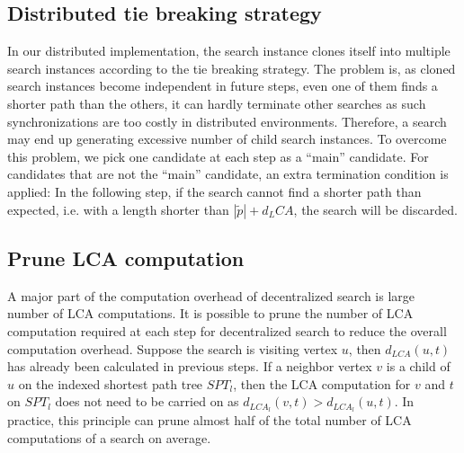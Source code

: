 \subsection{Distributed tie breaking strategy}
In our distributed implementation, the search instance clones itself into multiple search instances according to the tie breaking strategy. The problem is, as cloned search instances become independent in future steps, even one of them finds a shorter path than the others, it can hardly terminate other searches as such synchronizations are too costly in distributed environments. Therefore, a search may end up generating excessive number of child search instances. To overcome this problem, we pick one candidate at each step as a ``main'' candidate. For candidates that are not the ``main'' candidate, an extra termination condition is applied: In the following step, if the search cannot find a shorter path than expected, i.e. with a length shorter than $|\tilde{p}| + d_LCA$, the search will be discarded. 

\subsection{Prune LCA computation}
A major part of the computation overhead of decentralized search is large number of LCA computations. It is possible to prune the number of LCA computation required at each step for decentralized search to reduce the overall computation overhead. Suppose the search is visiting vertex $u$, then $d_{LCA}(u, t)$ has already been calculated in previous steps. If a neighbor vertex $v$ is a child of $u$ on the indexed shortest path tree $SPT_l$, then the LCA computation for $v$ and $t$ on $SPT_l$ does not need to be carried on as $d_{LCA_l}(v, t) > d_{LCA_l}(u, t)$. In practice, this principle can prune almost half of the total number of LCA computations of a search on average.
